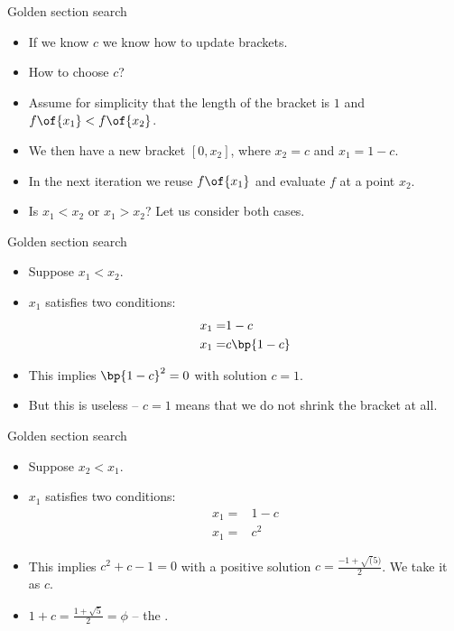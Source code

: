 \documentclass[11pt,xcolor={dvipsnames},aspectratio=159,hyperref={pdftex,pdfpagemode=UseNone,hidelinks,pdfdisplaydoctitle=true},usepdftitle=false]{beamer}
\begin{document}
\begin{frame}{Golden section search}
    \begin{itemize}
        \item If we know $c$ we know how to update brackets. 
        \item How to choose $c$?
        \item Assume for simplicity that the length of the bracket is $1$ and $f\of{x_1}<f\of{x_2}$.
        \item We then have a new bracket $[0,x_2]$, where $x_2 = c$ and $x_1 = 1-c$.
        \item In the next iteration we reuse $f\of{x_1}$ and evaluate $f$ at a  point $x_2$.
        \item Is $x_1<x_2$ or $x_1>x_2$? Let us consider both cases. 
\end{itemize}
\end{frame}


\begin{frame}{Golden section search}
    \begin{itemize}
        \item Suppose $x_1<x_2$.
        \item $x_1$ satisfies two conditions: \begin{align*}
            x_1 =&  1 - c \\
            x_1 =&  c \bp{1-c}
        \end{align*}
        \item This implies $\bp{1-c}^2 =0$ with solution $c=1$.
        \item But this is useless -- $c=1$ means that we do not shrink the bracket at all.
\end{itemize}
\end{frame}

\begin{frame}{Golden section search}
    \begin{itemize}
        \item Suppose $x_2<x_1$.
        \item $x_1$ satisfies two conditions: \begin{align*}
            x_1 =&  1- c \\
            x_1 =&  c^2
        \end{align*}
        \item This implies $c^2 +c -1 =0$ with a positive solution $c=\frac{-1+\sqrt(5)}{2}$. We take it as $c$.
        \item $1+c = \frac{1+\sqrt{5}}{2} = \phi$ -- the .
\end{itemize}
\end{frame}
\end{document}
